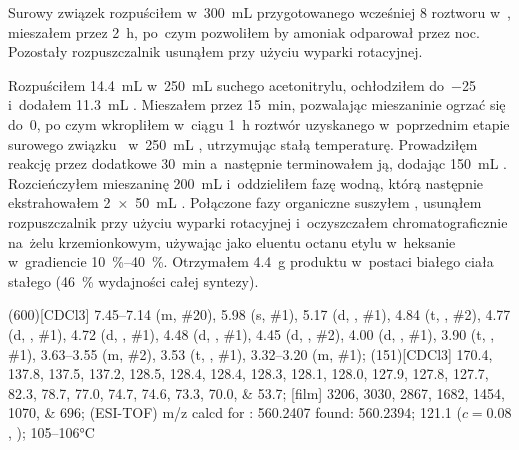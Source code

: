 Surowy związek  rozpuściłem w~\SI{300}{\mL}
	przygotowanego wcześniej \SI{8}{\Molar} roztworu  w~,
	mieszałem przez \SI{2}{\hour}, po~czym pozwoliłem by amoniak odparował przez noc.
Pozostały rozpuszczalnik usunąłem przy użyciu wyparki rotacyjnej.

Rozpuściłem \SI{14.4}{\mL}  w~\SI{250}{\mL} suchego acetonitrylu,
	ochłodziłem do~\SI{-25}{\degC} i~dodałem \SI{11.3}{\mL} .
Mieszałem przez \SI{15}{\minute}, pozwalając mieszaninie ogrzać się do~\SI{0}{\degC},
	po czym wkropliłem w~ciągu \SI{1}{\hour} roztwór uzyskanego w~poprzednim etapie surowego
	związku~ w~\SI{250}{\mL} , utrzymując stałą temperaturę.
Prowadziłęm reakcję przez dodatkowe \SI{30}{\minute} a~następnie terminowałem ją, dodając
	\SI{150}{\mL} .
Rozcieńczyłem mieszaninę \SI{200}{\mL}  i~oddzieliłem fazę wodną, którą następnie
	ekstrahowałem \SI[product-units = single]{2 x 50}{\mL} .
Połączone fazy organiczne suszyłem , usunąłem rozpuszczalnik przy użyciu wyparki
	rotacyjnej i~oczyszczałem chromatograficznie na~żelu krzemionkowym,
	używając jako eluentu octanu etylu w~heksanie w~gradiencie \SIrange{10}{40}{\percent}.
Otrzymałem \SI{4.4}{\gram} produktu w~postaci białego ciała stałego
	(\SI{46}{\percent} wydajności całej syntezy).

\begin{fullexp}
  \NMR(600)[CDCl3] \numrange{7.45}{7.14} (m, \#{20}), \num{5.98} (s, \#{1}), \num{5.17} (d, , \#{1}), \num{4.84} (t, , \#{2}), \num{4.77} (d, , \#{1}), \num{4.72} (d, , \#{1}), \num{4.48} (d, , \#{1}), \num{4.45} (d, , \#{2}), \num{4.00} (d, , \#{1}), \num{3.90} (t, , \#{1}), \numrange{3.63}{3.55} (m, \#{2}), \num{3.53} (t, , \#{1}), \numrange{3.32}{3.20} (m, \#{1}); 
  (151)[CDCl3] \numlist{170.4; 137.8; 137.5; 137.2; 128.5; 128.4; 128.4; 128.3; 128.1; 128.0; 127.9; 127.8; 127.7; 82.3; 78.7; 77.0; 74.7; 74.6; 73.3; 70.0; 53.7}; 
  [film] \numlist{3206; 3030; 2867; 1682; 1454; 1070; 696}; 
   (ESI-TOF) m/z calcd for : \num{560.2407} found: \num{560.2394};
  \data{[$\alpha^{23}_D$]~$=$} \num{121.1} ($c = 0.08$, ); 
   \numrange{105}{106}\si{\celsius}
\end{fullexp}

